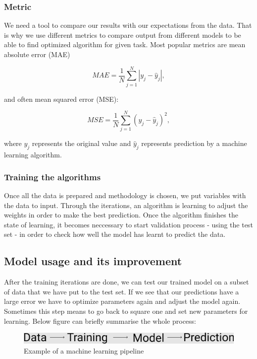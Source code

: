 \documentclass[a4paper,oneside,openright,11pt]{book}
\begin{document}
\subsubsection{Metric}

We need a tool to compare our results with our expectations from the data. That is why we use different metrics to compare output from different models to be able to find optimized algorithm for given task. Most popular metrics are mean absolute error (MAE)

\begin{equation}
    MAE = \frac{1}{N}\sum_{j=1}^{N}|y_{j} - \hat{y}_{j}|,
\end{equation}

and often mean squared error (MSE):


\begin{equation}
    MSE = \frac{1}{N}\sum_{j=1}^{N}(y_{j} - \hat{y}_{j})^{2},
\end{equation}


where $y_j$ represents the original value and $\hat{y}_j$ represents prediction by a machine learning algorithm.


\subsubsection{Training the algorithms}

Once all the data is prepared and methodology is chosen, we put variables with the data to input. Through the iterations, an algorithm is learning to adjust the weights in order to make the best prediction. Once the algorithm finishes the state of learning, it becomes neccessary to start validation process - using the test set - in order to check how well the model has learnt to predict the data.



\subsection{Model usage and its improvement}

After the training iterations are done, we can test our trained model on a subset of data that we have put to the test set. If we see that our predictions have a large error we have to optimize parameters again and adjust the model again. Sometimes this step means to go back to square one and set new parameters for learning. Below figure can briefly summarise the whole process:

\begin{figure}[h]
\centering
\includegraphics[scale=0.5]{DocumentFigures/MyFigures/strzalkiver.png}
\caption{Example of a machine learning pipeline \cite{MLpipeline} }
\end{figure}
\end{document}
